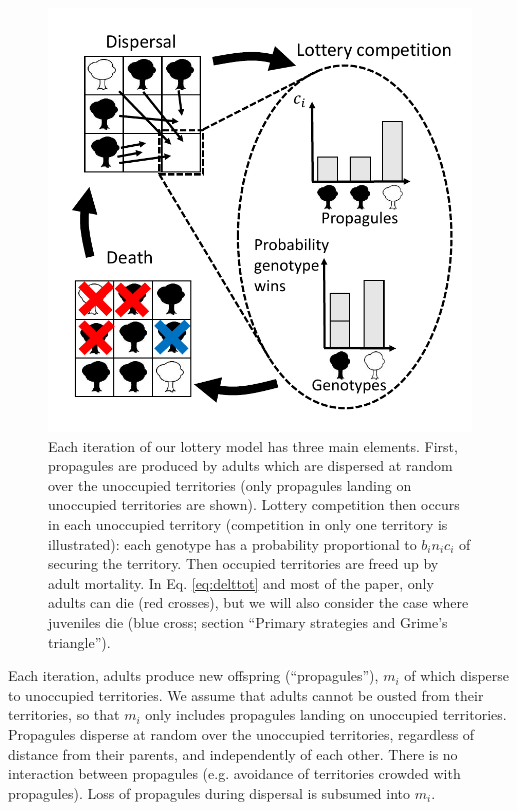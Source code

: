 \documentclass[11pt]{article}
\begin{document}
\begin{figure}
\centering
\includegraphics[scale=0.8]{lottery.pdf}
\caption{\label{fig:lottery} Each iteration of our lottery model has three main elements. First, propagules are produced by adults which are dispersed at random over the unoccupied territories (only propagules landing on unoccupied territories are shown). Lottery competition then occurs in each unoccupied territory (competition in only one territory is illustrated): each genotype has a probability proportional to $b_i n_i c_i$ of securing the territory. Then occupied territories are freed up by adult mortality. In Eq. \eqref{eq:delttot} and most of the paper, only adults can die (red crosses), but we will also consider the case where juveniles die (blue cross; section ``Primary strategies and Grime's triangle'').}
\end{figure}

Each iteration, adults produce new offspring (``propagules''), $m_i$ of which disperse to unoccupied territories. We assume that adults cannot be ousted from their territories, so that $m_i$ only includes propagules landing on unoccupied territories. Propagules disperse at random over the unoccupied territories, regardless of distance from their parents, and independently of each other. There is no interaction between propagules (e.g. avoidance of territories crowded with propagules). Loss of propagules during dispersal is subsumed into $m_i$. 
\end{document}

